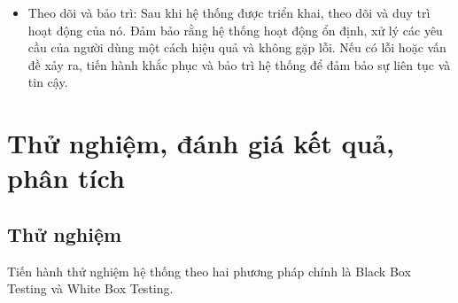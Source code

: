 \documentclass[12pt]{article}
\begin{document}
\begin{itemize}
    \item Theo dõi và bảo trì: Sau khi hệ thống được triển khai, theo dõi và duy trì hoạt động của nó. Đảm bảo rằng hệ thống hoạt động ổn định, xử lý các yêu cầu của người dùng một cách hiệu quả và không gặp lỗi. Nếu có lỗi hoặc vấn đề xảy ra, tiến hành khắc phục và bảo trì hệ thống để đảm bảo sự liên tục và tin cậy.
\end{itemize}
\section{Thử nghiệm, đánh giá kết quả, phân tích}
\subsection{Thử nghiệm}
Tiến hành thử nghiệm hệ thống theo hai phương pháp chính là Black Box Testing và White Box Testing.
\end{document}
